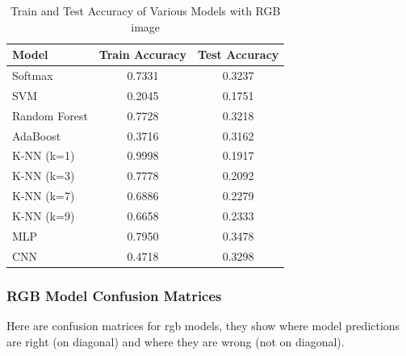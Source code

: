 \documentclass{article}
\begin{document}
\begin{table}[htbp]
    \centering
    \begin{tabular}{lcc}
        \toprule
        Model & Train Accuracy & Test Accuracy \\
        \toprule
        Softmax & 0.7331 & 0.3237 \\
        \midrule
        SVM & 0.2045 & 0.1751 \\
        \midrule
        Random Forest & 0.7728 & 0.3218 \\
        \midrule
        AdaBoost & 0.3716 & 0.3162 \\
        \midrule
        K-NN (k=1) & 0.9998 & 0.1917 \\
        \midrule
        K-NN (k=3) & 0.7778 & 0.2092 \\
        \midrule
        K-NN (k=7) & 0.6886 & 0.2279 \\
        \midrule
        K-NN (k=9) & 0.6658 & 0.2333 \\
        \midrule
        MLP & 0.7950 & 0.3478 \\
        \midrule
        CNN & 0.4718 & 0.3298 \\
        \bottomrule
    \end{tabular}
    \caption{Train and Test Accuracy of Various Models with RGB image}
    \label{tab:RGB scores}
\end{table}
\FloatBarrier 

\subsubsection{RGB Model Confusion Matrices}
Here are confusion matrices for rgb models, they show where model predictions are right (on diagonal) and where they are wrong (not on diagonal).
\end{document}
